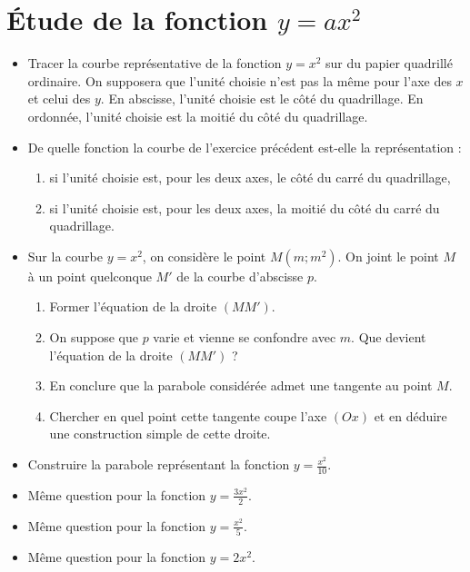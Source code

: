 \documentclass[12 pt]{report}
\theoremstyle{plain}
\newcounter{n}
\renewcommand{\it}{\item[$\mathbf{\then}.$]\stepcounter{n} }
\begin{document}
 \chapter{Étude de la fonction \texorpdfstring{$y=ax^2$}{y=ax2}}
 \begin{itemize}
 \it Tracer la courbe représentative de la fonction $y=x^2$ sur du papier quadrillé ordinaire. On supposera que l'unité choisie n'est pas la même pour l'axe des $x$ et celui des $y$. En abscisse, l'unité choisie est le côté du quadrillage. En ordonnée, l'unité choisie est la moitié du côté du quadrillage.
 \it De quelle fonction la courbe de l'exercice précédent est-elle la représentation : \begin{enumerate}
 \item si l'unité choisie est, pour les deux axes, le côté du carré du quadrillage,
 \item si l'unité choisie est, pour les deux axes, la moitié du côté du carré du quadrillage. 
 \end{enumerate}
 \it Sur la courbe $y=x^2$, on considère le point $M(m;m^2)$. On joint le point $M$ à un point quelconque $M'$ de la courbe d'abscisse $p$. \begin{enumerate}
 \item Former l'équation de la droite $(MM')$. 
 \item On suppose que $p$ varie et vienne se confondre avec $m$. Que devient l'équation de la droite $(MM')$ ? 
 \item En conclure que la parabole considérée admet une tangente au point $M$. 
 \item Chercher en quel point cette tangente coupe l'axe $(Ox)$ et en déduire une construction simple de cette droite. 
 \end{enumerate}
 \it Construire la parabole représentant la fonction $y=\frac{x^2}{10}.$
 \it Même question pour la fonction $y=\frac{3x^2}2$. 
 \it Même question pour la fonction $y=\frac{x^2}5$. 
 \it Même question pour la fonction $y=2x^2$. 
 \end{itemize}
\end{document}
